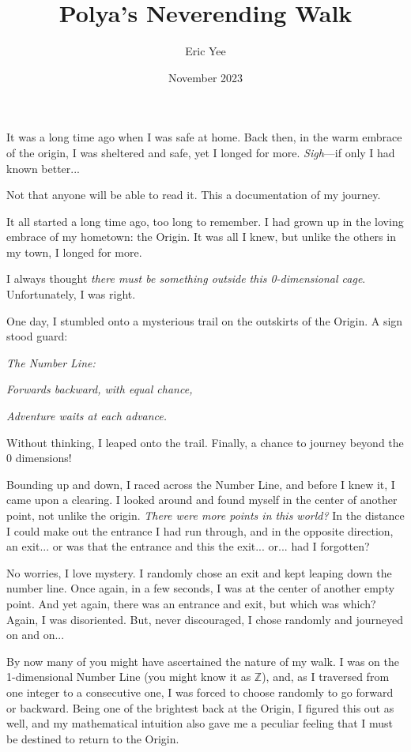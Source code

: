 \documentclass{article}
\title{Polya's Neverending Walk}
\author{Eric Yee}
\date{November 2023}
\begin{document}
\maketitle

It was a long time ago when I was safe at home. Back then, in the warm embrace of the origin, I was sheltered and safe, yet I longed for more. \emph{Sigh}---if only I had known better... 

Not that anyone will be able to read it. This a documentation of my journey.

It all started a long time ago, too long to remember. I had grown up in the loving embrace of my hometown: the Origin. It was all I knew, but unlike the others in my town, I longed for more. 

I always thought \emph{there must be something outside this 0-dimensional cage}. Unfortunately, I was right.

One day, I stumbled onto a mysterious trail on the outskirts of the Origin. A sign stood guard:

\emph{
The Number Line: }

\emph{
Forwards backward, with equal chance,}

\emph{
Adventure waits at each advance.
}

Without thinking, I leaped onto the trail. Finally, a chance to journey beyond the 0 dimensions! 

Bounding up and down, I raced across the Number Line, and before I knew it, I came upon a clearing. I looked around and found myself in the center of another point, not unlike the origin. \emph{There were more points in this world?} In the distance I could make out the entrance I had run through, and in the opposite direction, an exit... or was that the entrance and this the exit... or... had I forgotten? 


No worries, I love mystery. I randomly chose an exit and kept leaping down the number line.  Once again, in a few seconds, I was at the center of another empty point. And yet again, there was an entrance and exit, but which was which? Again, I was disoriented. But, never discouraged, I chose randomly and journeyed on and on...

By now many of you might have ascertained the nature of my walk. I was on the 1-dimensional Number Line (you might know it as $\mathbb{Z}$), and, as I traversed from one integer to a consecutive one, I was forced to choose randomly to go forward or backward. Being one of the brightest back at the Origin, I figured this out as well, and my mathematical intuition also gave me a peculiar feeling that I must be destined to return to the Origin. 
\end{document}
